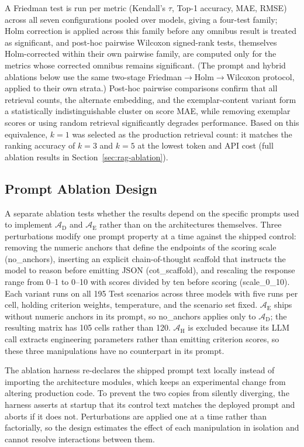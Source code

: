 \documentclass[final,3p,times]{elsarticle}
\begin{document}
A Friedman test is run per metric (Kendall's $\tau$, Top-1 accuracy, MAE, RMSE) across all seven configurations pooled over models, giving a four-test family; Holm correction is applied across this family before any omnibus result is treated as significant, and post-hoc pairwise Wilcoxon signed-rank tests, themselves Holm-corrected within their own pairwise family, are computed only for the metrics whose corrected omnibus remains significant. (The prompt and hybrid ablations below use the same two-stage Friedman$\to$Holm$\to$Wilcoxon protocol, applied to their own strata.) Post-hoc pairwise comparisons confirm that all retrieval counts, the alternate embedding, and the exemplar-content variant form a statistically indistinguishable cluster on score MAE, while removing exemplar scores or using random retrieval significantly degrades performance. Based on this equivalence, $k=1$ was selected as the production retrieval count: it matches the ranking accuracy of $k=3$ and $k=5$ at the lowest token and API cost (full ablation results in Section~\ref{sec:rag-ablation}).

\subsection{Prompt Ablation Design}
\label{sec:prompt-ablation-methods}
A separate ablation tests whether the results depend on the specific prompts used to implement $\mathcal{A}_{\text{D}}$ and $\mathcal{A}_{\text{E}}$ rather than on the architectures themselves. Three perturbations modify one prompt property at a time against the shipped control: removing the numeric anchors that define the endpoints of the scoring scale (no\_anchors), inserting an explicit chain-of-thought scaffold that instructs the model to reason before emitting JSON (cot\_scaffold), and rescaling the response range from 0--1 to 0--10 with scores divided by ten before scoring (scale\_0\_10). Each variant runs on all 195 Test scenarios across three models with five runs per cell, holding criterion weights, temperature, and the scenario set fixed. $\mathcal{A}_{\text{E}}$ ships without numeric anchors in its prompt, so no\_anchors applies only to $\mathcal{A}_{\text{D}}$; the resulting matrix has 105 cells rather than 120. $\mathcal{A}_{\text{H}}$ is excluded because its LLM call extracts engineering parameters rather than emitting criterion scores, so these three manipulations have no counterpart in its prompt.

The ablation harness re-declares the shipped prompt text locally instead of importing the architecture modules, which keeps an experimental change from altering production code. To prevent the two copies from silently diverging, the harness asserts at startup that its control text matches the deployed prompt and aborts if it does not. Perturbations are applied one at a time rather than factorially, so the design estimates the effect of each manipulation in isolation and cannot resolve interactions between them.
\end{document}
